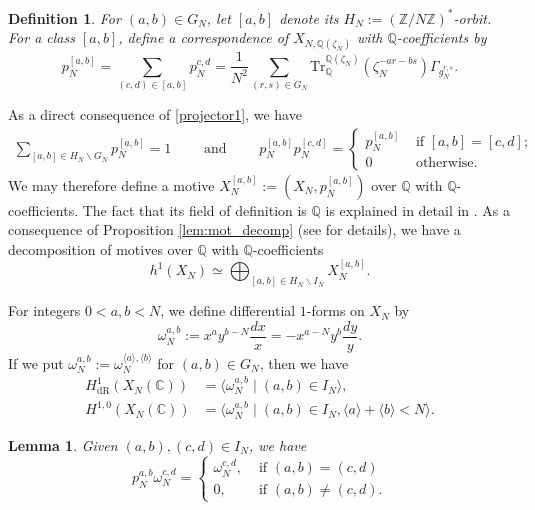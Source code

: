 \documentclass[11pt,a4,leqno]{amsart}
\theoremstyle{my theoremstyle}
\newtheorem{lem}[thm]{Lemma}
\theoremstyle{dfn}
\newtheorem{dfn}[thm]{Definition}
\theoremstyle{remark}
\renewcommand{\1}{\mathbbm{1}}
\newcommand{\Z}{\mathbb{Z}}
\newcommand{\Q}{\mathbb{Q}}
\newcommand{\C}{\mathbb{C}}
\newcommand{\z}{\zeta}
\numberwithin{equation}{section}
\begin{document}
\begin{dfn}
For $(a, b) \in G_N$, let $[a, b]$ denote its $H_N:=(\Z/N\Z)^*$-orbit.  For a class $[a, b]$, define 
a correspondence of $X_{N, \Q(\z_N)}$ with $\Q$-coefficients by 
$$p_N^{[a, b]}= \sum_{(c, d) \in [a, b]} p_N^{c, d}=\frac{1}{N^2} \sum_{(r,s)\in G_N} \mathrm{Tr}^{\Q(\zeta_N)}_{\Q}(\zeta_N^{-ar-bs}) \Gamma_{g_N^{r, s}}. $$
\end{dfn}
As a direct consequence of \eqref{projector1}, we have 
\begin{align*} 
 \sum_{[a, b] \in H_N \backslash G_N} p_N^{[a, b]}=1 \qquad \text{ and } \qquad p_N^{[a, b]} p_N^{[c, d]}=
  \left\{
\begin{array}{ll}
p_N^{[a, b]}& \text{ if } [a, b]=[c, d];\\
0 & \text{ otherwise.} 
\end{array}
\right.
\end{align*}
We may therefore define a motive $X_N^{[a, b]}:=(X_N, p_N^{[a, b]})$ over $\Q$ with $\Q$-coefficients. The fact that its field of definition is $\Q$ is explained in detail in \cite[p. 40]{Ots11}. As a consequence of Proposition \ref{lem:mot_decomp} (see \cite[Proposition 2.11]{Ots11} for details), we have a decomposition of motives over $\Q$ with $\Q$-coefficients
\begin{equation} \label{decomp h1XN}
h^1(X_{N}) \simeq \bigoplus_{[a, b] \in H_N \backslash I_N} X_N^{[a, b]}.  
\end{equation}

For integers $0<a,b<N$, we define differential $1$-forms on $X_N$ by
\begin{equation}\label{omegars}
    \omega_N^{a,b}:=x^a y^{b-N} \frac{dx}{x}=-x^{a-N} y^b \frac{dy}y.
\end{equation}
If we put $\omega_N^{a,b}:=\omega_N^{\langle a \rangle, \langle b \rangle}$ for $(a,b)\in G_N$, then we have 
\begin{align}
\label{H1dR}    H^1_{\mathrm{dR}}(X_N(\C)) & = \langle \omega_N^{a,b} \mid (a,b) \in I_N \rangle, \\
\label{Omega1}  H^{1,0}(X_N(\C)) & =\langle \omega_N^{a,b} \mid (a,b) \in I_N, \langle a \rangle + \langle b \rangle < N  \rangle.
\end{align}

\begin{lem}\label{lem:proj_1form}
    Given $(a,b), (c,d)\in I_N$, we have 
    \[
    p_N^{a,b} \omega_N^{c,d}=
    \begin{cases}
            \omega_N^{c,d}, & \text{ if } (a,b) = (c,d) \\
            0, & \text{ if } (a,b)\neq (c,d).
        \end{cases} 
    \]
\end{lem}
\end{document}
